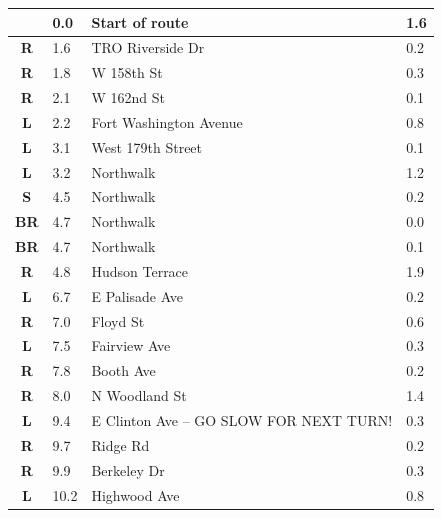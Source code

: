 \documentclass[11pt]{article}
\begin{document}
\renewcommand{\arraystretch}{1.15}
\twocolumn
{}
\tabletail{\hline}
\tablelasttail{\hline}
\begin{center}
  \begin{supertabular}{|c|p{0.30in}|p{2.25in}|l|}
  \hline
{} \textbf{} &   0.0 & Start of route &   1.6 \\ \hline
{} \textbf{R} &   1.6 & TRO Riverside Dr &   0.2 \\ \hline
{} \textbf{R} &   1.8 & W 158th St &   0.3 \\ \hline
{} \textbf{R} &   2.1 & W 162nd St &   0.1 \\ \hline
 \textbf{L} &   2.2 & Fort Washington Avenue &   0.8 \\ \hline
 \textbf{L} &   3.1 & West 179th Street &   0.1 \\ \hline
 \textbf{L} &   3.2 & Northwalk &   1.2 \\ \hline
 \textbf{S} &   4.5 & Northwalk &   0.2 \\ \hline
{} \textbf{BR} &   4.7 & Northwalk &   0.0 \\ \hline
{} \textbf{BR} &   4.7 & Northwalk &   0.1 \\ \hline
{} \textbf{R} &   4.8 & Hudson Terrace &   1.9 \\ \hline
 \textbf{L} &   6.7 & E Palisade Ave &   0.2 \\ \hline
{} \textbf{R} &   7.0 & Floyd St &   0.6 \\ \hline
 \textbf{L} &   7.5 & Fairview Ave &   0.3 \\ \hline
{} \textbf{R} &   7.8 & Booth Ave &   0.2 \\ \hline
{} \textbf{R} &   8.0 & N Woodland St &   1.4 \\ \hline
 \textbf{L} &   9.4 & E Clinton Ave -- GO SLOW FOR NEXT TURN! &   0.3 \\ \hline
{} \textbf{R} &   9.7 & Ridge Rd &   0.2 \\ \hline
{} \textbf{R} &   9.9 & Berkeley Dr &   0.3 \\ \hline
 \textbf{L} &  10.2 & Highwood Ave &   0.8 \\ \hline

\end{supertabular}
\end{center}
\end{document}

